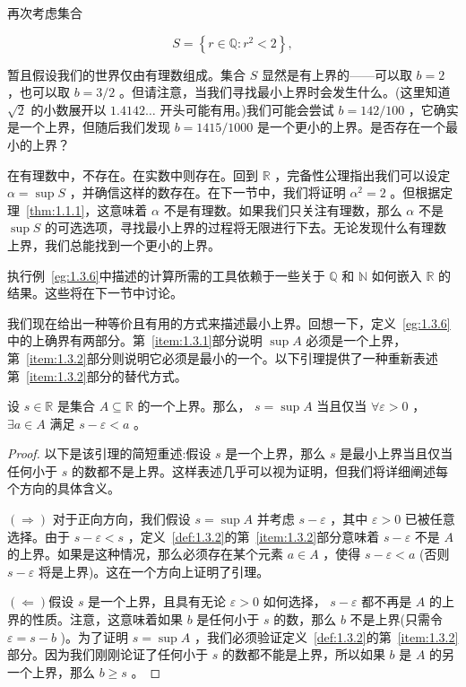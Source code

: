 \begin{Eg}
  \label{eg:1.3.6}
再次考虑集合

\[
S = \left\{  {r \in  \mathbb{Q} : {r}^{2} < 2}\right\}  ,
\]

暂且假设我们的世界仅由有理数组成。集合 \(S\) 显然是有上界的——可以取 \(b = 2\) ，也可以取 \(b = 3/2\) 。但请注意，当我们寻找最小上界时会发生什么。(这里知道 \(\sqrt{2}\) 的小数展开以 \({1.4142}\ldots\) 开头可能有用。)我们可能会尝试 \(b = {142}/{100}\) ，它确实是一个上界，但随后我们发现 \(b = {1415}/{1000}\) 是一个更小的上界。是否存在一个最小的上界？

在有理数中，不存在。在实数中则存在。回到 \(\mathbb{R}\) ，完备性公理指出我们可以设定 \(\alpha  = \sup S\) ，并确信这样的数存在。在下一节中，我们将证明 \({\alpha }^{2} = 2\) 。但根据定理~\ref{thm:1.1.1}，这意味着 \(\alpha\) 不是有理数。如果我们只关注有理数，那么 \(\alpha\) 不是 \(\sup S\) 的可选选项，寻找最小上界的过程将无限进行下去。无论发现什么有理数上界，我们总能找到一个更小的上界。
\end{Eg}

执行例~\ref{eg:1.3.6}中描述的计算所需的工具依赖于一些关于 \(\mathbb{Q}\) 和 \(\mathbb{N}\) 如何嵌入 \(\mathbb{R}\) 的结果。这些将在下一节中讨论。

我们现在给出一种等价且有用的方式来描述最小上界。回想一下，定义~\ref{eg:1.3.6}中的上确界有两部分。第~\ref{item:1.3.1}部分说明 \(\sup A\) 必须是一个上界，第~\ref{item:1.3.2}部分则说明它必须是最小的一个。以下引理提供了一种重新表述第~\ref{item:1.3.2}部分的替代方式。

\begin{Lem}
  \label{lem:1.3.7}
设 \(s \in  \mathbb{R}\) 是集合 \(A \subseteq  \mathbb{R}\) 的一个上界。那么， \(s = \sup A\) 当且仅当 \(\forall \varepsilon  > 0\) ， \(\exists a \in  A\) 满足 \(s - \varepsilon  < a\) 。  
\end{Lem}

\begin{proof}
以下是该引理的简短重述:假设 \(s\) 是一个上界，那么 \(s\) 是最小上界当且仅当任何小于 \(s\) 的数都不是上界。这样表述几乎可以视为证明，但我们将详细阐述每个方向的具体含义。

\(\left(  \Rightarrow  \right)\) 对于正向方向，我们假设 \(s = \sup A\) 并考虑 \(s - \varepsilon\) ，其中 \(\varepsilon  > 0\) 已被任意选择。由于 \(s - \varepsilon  < s\) ，定义~\ref{def:1.3.2}的第~\ref{item:1.3.2}部分意味着 \(s - \varepsilon\) 不是 \(A\) 的上界。如果是这种情况，那么必须存在某个元素 \(a \in  A\) ，使得 \(s - \varepsilon  < a\) (否则 \(s - \varepsilon\) 将是上界)。这在一个方向上证明了引理。

$\left( \Leftarrow \right)$假设 \(s\) 是一个上界，且具有无论 \(\varepsilon  > 0\) 如何选择， \(s - \varepsilon\) 都不再是 \(A\) 的上界的性质。注意，这意味着如果 \(b\) 是任何小于 \(s\) 的数，那么 \(b\) 不是上界(只需令 \(\varepsilon  = s - b\) )。为了证明 \(s = \sup A\) ，我们必须验证定义~\ref{def:1.3.2}的第~\ref{item:1.3.2}部分。因为我们刚刚论证了任何小于 \(s\) 的数都不能是上界，所以如果 \(b\) 是 \(A\) 的另一个上界，那么 \(b \geq  s\) 。  
\end{proof}

